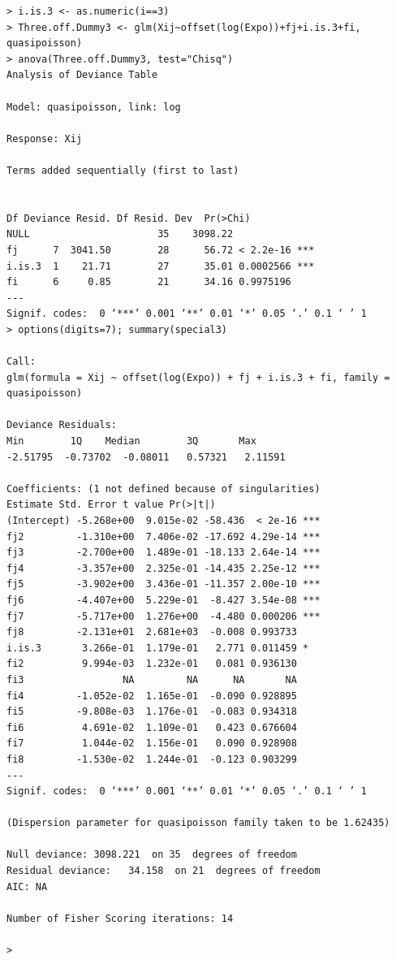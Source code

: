 \documentclass[11pt]{article}
\begin{document}
\begin{verbatim}
> i.is.3 <- as.numeric(i==3)
> Three.off.Dummy3 <- glm(Xij~offset(log(Expo))+fj+i.is.3+fi, quasipoisson)
> anova(Three.off.Dummy3, test="Chisq")
Analysis of Deviance Table

Model: quasipoisson, link: log

Response: Xij

Terms added sequentially (first to last)


Df Deviance Resid. Df Resid. Dev  Pr(>Chi)    
NULL                      35    3098.22              
fj      7  3041.50        28      56.72 < 2.2e-16 ***
i.is.3  1    21.71        27      35.01 0.0002566 ***
fi      6     0.85        21      34.16 0.9975196    
---
Signif. codes:  0 ‘***’ 0.001 ‘**’ 0.01 ‘*’ 0.05 ‘.’ 0.1 ‘ ’ 1
> options(digits=7); summary(special3)

Call:
glm(formula = Xij ~ offset(log(Expo)) + fj + i.is.3 + fi, family = quasipoisson)

Deviance Residuals: 
Min        1Q    Median        3Q       Max  
-2.51795  -0.73702  -0.08011   0.57321   2.11591  

Coefficients: (1 not defined because of singularities)
Estimate Std. Error t value Pr(>|t|)    
(Intercept) -5.268e+00  9.015e-02 -58.436  < 2e-16 ***
fj2         -1.310e+00  7.406e-02 -17.692 4.29e-14 ***
fj3         -2.700e+00  1.489e-01 -18.133 2.64e-14 ***
fj4         -3.357e+00  2.325e-01 -14.435 2.25e-12 ***
fj5         -3.902e+00  3.436e-01 -11.357 2.00e-10 ***
fj6         -4.407e+00  5.229e-01  -8.427 3.54e-08 ***
fj7         -5.717e+00  1.276e+00  -4.480 0.000206 ***
fj8         -2.131e+01  2.681e+03  -0.008 0.993733    
i.is.3       3.266e-01  1.179e-01   2.771 0.011459 *  
fi2          9.994e-03  1.232e-01   0.081 0.936130    
fi3                 NA         NA      NA       NA    
fi4         -1.052e-02  1.165e-01  -0.090 0.928895    
fi5         -9.808e-03  1.176e-01  -0.083 0.934318    
fi6          4.691e-02  1.109e-01   0.423 0.676604    
fi7          1.044e-02  1.156e-01   0.090 0.928908    
fi8         -1.530e-02  1.244e-01  -0.123 0.903299    
---
Signif. codes:  0 ‘***’ 0.001 ‘**’ 0.01 ‘*’ 0.05 ‘.’ 0.1 ‘ ’ 1

(Dispersion parameter for quasipoisson family taken to be 1.62435)

Null deviance: 3098.221  on 35  degrees of freedom
Residual deviance:   34.158  on 21  degrees of freedom
AIC: NA

Number of Fisher Scoring iterations: 14

>
\end{verbatim}
\end{document}
